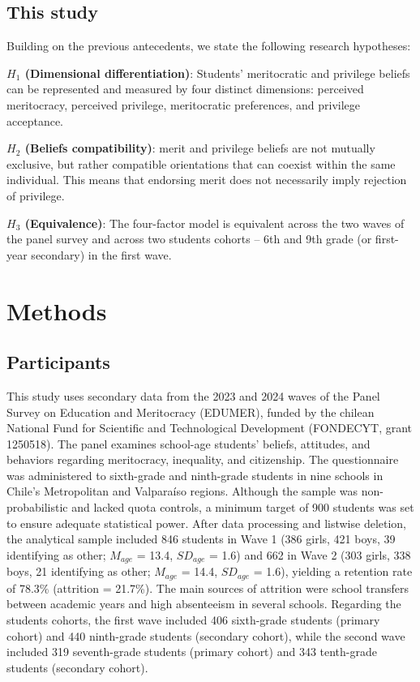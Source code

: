 \documentclass[
  13pt,
]{article}
\begin{document}
\subsection{This study}\label{this-study}

Building on the previous antecedents, we state the following research
hypotheses:

\textbf{\(H_1\) (Dimensional differentiation)}: Students' meritocratic
and privilege beliefs can be represented and measured by four distinct
dimensions: perceived meritocracy, perceived privilege, meritocratic
preferences, and privilege acceptance.

\textbf{\(H_2\) (Beliefs compatibility)}: merit and privilege beliefs
are not mutually exclusive, but rather compatible orientations that can
coexist within the same individual. This means that endorsing merit does
not necessarily imply rejection of privilege.

\textbf{\(H_3\) (Equivalence)}: The four-factor model is equivalent
across the two waves of the panel survey and across two students cohorts
-- 6th and 9th grade (or first-year secondary) in the first wave.

\section{Methods}\label{methods}

\subsection{Participants}\label{participants}

This study uses secondary data from the 2023 and 2024 waves of the Panel
Survey on Education and Meritocracy (EDUMER), funded by the chilean
National Fund for Scientific and Technological Development (FONDECYT,
grant 1250518). The panel examines school-age students' beliefs,
attitudes, and behaviors regarding meritocracy, inequality, and
citizenship. The questionnaire was administered to sixth-grade and
ninth-grade students in nine schools in Chile's Metropolitan and
Valparaíso regions. Although the sample was non-probabilistic and lacked
quota controls, a minimum target of 900 students was set to ensure
adequate statistical power. After data processing and listwise deletion,
the analytical sample included 846 students in Wave 1 (386 girls, 421
boys, 39 identifying as other; \(M_{age}\) = 13.4, \(SD_{age}\) = 1.6)
and 662 in Wave 2 (303 girls, 338 boys, 21 identifying as other;
\(M_{age}\) = 14.4, \(SD_{age}\) = 1.6), yielding a retention rate of
78.3\% (attrition = 21.7\%). The main sources of attrition were school
transfers between academic years and high absenteeism in several
schools. Regarding the students cohorts, the first wave included 406
sixth-grade students (primary cohort) and 440 ninth-grade students
(secondary cohort), while the second wave included 319 seventh-grade
students (primary cohort) and 343 tenth-grade students (secondary
cohort).
\end{document}
